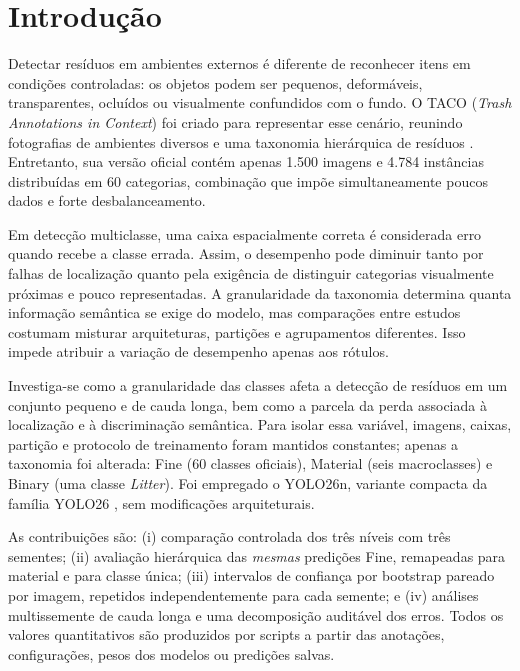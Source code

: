 \section{Introdução}

Detectar resíduos em ambientes externos é diferente de reconhecer itens em condições controladas: os objetos podem ser pequenos, deformáveis, transparentes, ocluídos ou visualmente confundidos com o fundo. O TACO (\textit{Trash Annotations in Context}) foi criado para representar esse cenário, reunindo fotografias de ambientes diversos e uma taxonomia hierárquica de resíduos \cite{proenca2020taco}. Entretanto, sua versão oficial contém apenas 1.500 imagens e 4.784 instâncias distribuídas em 60 categorias, combinação que impõe simultaneamente poucos dados e forte desbalanceamento.

Em detecção multiclasse, uma caixa espacialmente correta é considerada erro quando recebe a classe errada. Assim, o desempenho pode diminuir tanto por falhas de localização quanto pela exigência de distinguir categorias visualmente próximas e pouco representadas. A granularidade da taxonomia determina quanta informação semântica se exige do modelo, mas comparações entre estudos costumam misturar arquiteturas, partições e agrupamentos diferentes. Isso impede atribuir a variação de desempenho apenas aos rótulos.

Investiga-se como a granularidade das classes afeta a detecção de resíduos em um conjunto pequeno e de cauda longa, bem como a parcela da perda associada à localização e à discriminação semântica. Para isolar essa variável, imagens, caixas, partição e protocolo de treinamento foram mantidos constantes; apenas a taxonomia foi alterada: Fine (60 classes oficiais), Material (seis macroclasses) e Binary (uma classe \textit{Litter}). Foi empregado o YOLO26n, variante compacta da família YOLO26 \cite{jocher2026yolo26}, sem modificações arquiteturais.

As contribuições são: (i) comparação controlada dos três níveis com três sementes; (ii) avaliação hierárquica das \emph{mesmas} predições Fine, remapeadas para material e para classe única; (iii) intervalos de confiança por bootstrap pareado por imagem, repetidos independentemente para cada semente; e (iv) análises multissemente de cauda longa e uma decomposição auditável dos erros. Todos os valores quantitativos são produzidos por scripts a partir das anotações, configurações, pesos dos modelos ou predições salvas.
